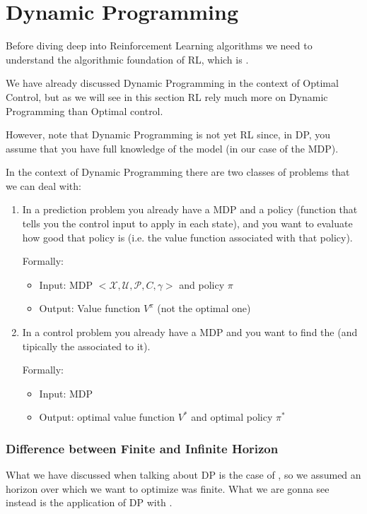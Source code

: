 \section{Dynamic Programming}
Before diving deep into Reinforcement Learning algorithms we need to understand the algorithmic foundation of RL, which is .

We have already discussed Dynamic Programming in the context of Optimal Control, but as we will see in this section RL rely much more on Dynamic Programming than Optimal control.

However, note that Dynamic Programming is not yet RL since, in DP, you assume that you have full knowledge of the model (in our case of the MDP).

In the context of Dynamic Programming there are two classes of problems that we can deal with:
\begin{enumerate}
\item {}

In a prediction problem you already have a MDP and a policy (function that tells you the control input to apply in each state), and you want to evaluate how good that policy is (i.e. the value function associated with that policy).

Formally:
\begin{itemize}
\item Input: MDP $<\mathcal{X},\mathcal{U}, \mathcal{P},C, \gamma>$ and policy $\pi$
\item Output: Value function $V^{\pi}$ (not the optimal one)
\end{itemize}
\item {}

In a control problem you already have a MDP and you want to find the  (and tipically the  associated to it).

Formally:
\begin{itemize}
\item Input: MDP
\item Output: optimal value function $V^*$ and optimal policy $\pi^*$
\end{itemize}
\end{enumerate}

\subsubsection{Difference between Finite and Infinite Horizon}
What we have discussed when talking about DP is the case of , so we assumed an horizon over which we want to optimize was finite. What we are gonna see  instead is the application of DP with .

